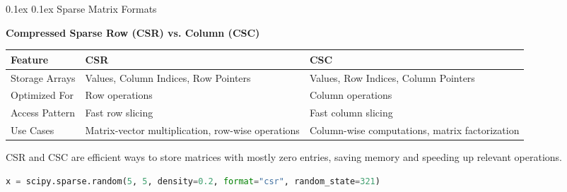 \documentclass[8pt,landscape]{article}
\makeatletter
\renewcommand{\subsection}{\@startsection{subsection}{2}{0pt}%
    {0.1ex}%
    {0.1ex}%
    {\fontsize{8}{9}\bfseries\color{blue}}} %
\newcommand{\smalltext}[1]{%
  {\fontsize{8}{9}\selectfont\sloppy #1\par}%
}
\makeatother
\begin{document}
\begin{multicols}{3}
\subsection{Sparse Matrix Formats}
\smalltext{
\textbf{Compressed Sparse Row (CSR) vs. Column (CSC)}
}
\centering
\begin{tabular}{p{1.4cm} p{1.6cm} p{1.6cm}}
\toprule
\textbf{Feature} & \textbf{CSR} & \textbf{CSC} \\
\midrule
Storage Arrays & Values, Column Indices, Row Pointers & Values, Row Indices, Column Pointers \\
Optimized For & Row operations & Column operations \\
Access Pattern & Fast row slicing & Fast column slicing \\
Use Cases & Matrix-vector multiplication, row-wise operations & Column-wise computations, matrix factorization \\
\bottomrule
\end{tabular}
\smalltext{
CSR and CSC are efficient ways to store matrices with mostly zero entries, saving memory and speeding up relevant operations.
}

\begin{lstlisting}[language=Python]
x = scipy.sparse.random(5, 5, density=0.2, format="csr", random_state=321)

\end{lstlisting}



\end{multicols}
\end{document}
